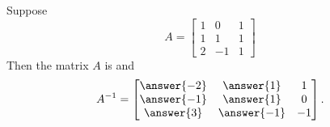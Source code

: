 \documentclass{ximera}
\begin{document}
\begin{exercise}
  Suppose
  \[
    A = \begin{bmatrix} 1 & 0 & 1 \\ 1 & 1 & 1 \\ 2 & -1 & 1\end{bmatrix}
  \]
  Then the matrix $A$ is  and
  \[
    A^{-1} = \begin{bmatrix} \answer{-2} & \answer{1} & 1 \\ \answer{-1} & \answer{1} & 0\\\answer{3} & \answer{-1} & -1 \end{bmatrix}.
  \]
\end{exercise}
\end{document}
